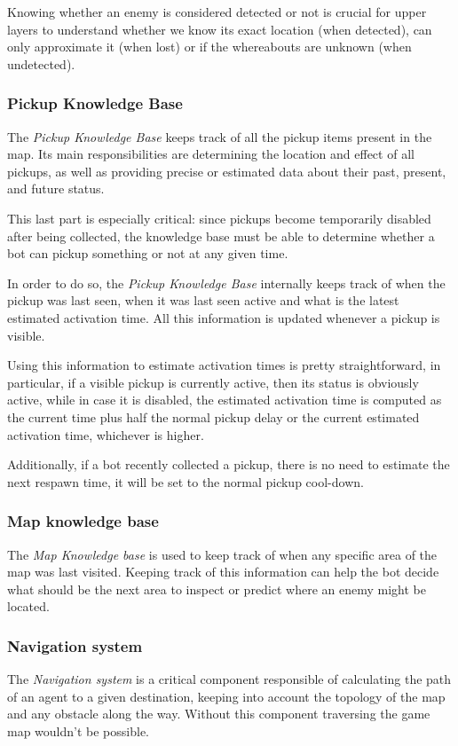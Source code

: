 Knowing whether an enemy is considered detected or not is crucial for upper layers to understand whether we know its exact location (when detected), can only approximate it (when lost) or if the whereabouts are unknown (when undetected).

\subsubsection{Pickup Knowledge Base}

The \textit{Pickup Knowledge Base} keeps track of all the pickup items present in the map. Its main responsibilities are determining the location and effect of all pickups, as well as providing precise or estimated data about their past, present, and future status.

This last part is especially critical: since pickups become temporarily disabled after being collected, the knowledge base must be able to determine whether a bot can pickup something or not at any given time.

In order to do so, the \textit{Pickup Knowledge Base} internally keeps track of when the pickup was last seen, when it was last seen active and what is the latest estimated activation time. All this information is updated whenever a pickup is visible. 

Using this information to estimate activation times is pretty straightforward, in particular, if a visible pickup is currently active, then its status is obviously active, while in case it is disabled, the estimated activation time is computed as the current time plus half the normal pickup delay or the current estimated activation time, whichever is higher.

Additionally, if a bot recently collected a pickup, there is no need to estimate the next respawn time, it will be set to the normal pickup cool-down.

\subsubsection{Map knowledge base}
The \textit{Map Knowledge base} is used to keep track of when any specific area of the map was last visited. Keeping track of this information can help the bot decide what should be the next area to inspect or predict where an enemy might be located.

\subsubsection{Navigation system}
The \textit{Navigation system} is a critical component responsible of calculating the path of an agent to a given destination, keeping into account the topology of the map and any obstacle along the way. Without this component traversing the game map wouldn't be possible.

